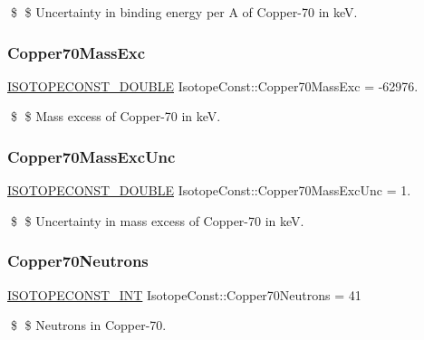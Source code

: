 \$ \$ Uncertainty in binding energy per A of Copper-\/70 in keV. \mbox{\label{group___isotope_const-_copper-_cu70_ga4992183876ecaf456d590679157b816d}} 
\subsubsection{\texorpdfstring{Copper70\+Mass\+Exc}{Copper70MassExc}}
{\footnotesize\ttfamily \mbox{\hyperlink{group___isotope_const-_macros_ga8f45a7272ce02c0b4c65c44636ed719a}{I\+S\+O\+T\+O\+P\+E\+C\+O\+N\+S\+T\+\_\+\+D\+O\+U\+B\+LE}} Isotope\+Const\+::\+Copper70\+Mass\+Exc = -\/62976.}

\$ \$ Mass excess of Copper-\/70 in keV. \mbox{\label{group___isotope_const-_copper-_cu70_ga82810682ad6291e148d9aa5d4a665818}} 
\subsubsection{\texorpdfstring{Copper70\+Mass\+Exc\+Unc}{Copper70MassExcUnc}}
{\footnotesize\ttfamily \mbox{\hyperlink{group___isotope_const-_macros_ga8f45a7272ce02c0b4c65c44636ed719a}{I\+S\+O\+T\+O\+P\+E\+C\+O\+N\+S\+T\+\_\+\+D\+O\+U\+B\+LE}} Isotope\+Const\+::\+Copper70\+Mass\+Exc\+Unc = 1.}

\$ \$ Uncertainty in mass excess of Copper-\/70 in keV. \mbox{\label{group___isotope_const-_copper-_cu70_gaf938c088d7ddf0458981ee493a4592f1}} 
\subsubsection{\texorpdfstring{Copper70\+Neutrons}{Copper70Neutrons}}
{\footnotesize\ttfamily \mbox{\hyperlink{group___isotope_const-_macros_ga5f18360b3e99483a35c32d789e62621c}{I\+S\+O\+T\+O\+P\+E\+C\+O\+N\+S\+T\+\_\+\+I\+NT}} Isotope\+Const\+::\+Copper70\+Neutrons = 41}

\$ \$ Neutrons in Copper-\/70. \mbox{\label{group___isotope_const-_copper-_cu70_gad070ef5c49b04be9a11cee5a81eae635}} 

